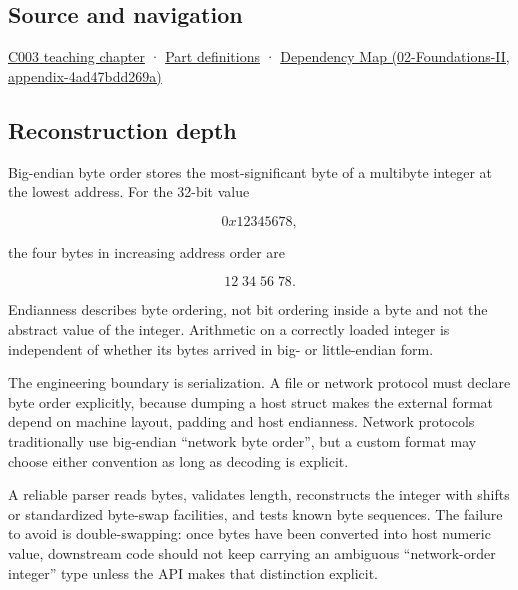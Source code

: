 \subsection{Source and navigation}\label{appendix-92e040df969a-source-and-navigation}

\hyperref[01-foundations-i-ch002-where-the-bytes-live]{C003 teaching chapter} · \hyperref[appendix-fd090d982a15-m003---parts-41-60]{Part definitions} · \href{../02-Foundations-II/main.pdf\#nameddest=appendix-4ad47bdd269a}{Dependency Map (02-Foundations-II, appendix-4ad47bdd269a)}

\subsection{Reconstruction depth}\label{appendix-92e040df969a-reconstruction-depth}

Big-endian byte order stores the most-significant byte of a multibyte integer at the lowest address. For the 32-bit value

\[
0x12345678,
\]

the four bytes in increasing address order are

\[
12\;34\;56\;78.
\]

Endianness describes byte ordering, not bit ordering inside a byte and not the abstract value of the integer. Arithmetic on a correctly loaded integer is independent of whether its bytes arrived in big- or little-endian form.

The engineering boundary is serialization. A file or network protocol must declare byte order explicitly, because dumping a host struct makes the external format depend on machine layout, padding and host endianness. Network protocols traditionally use big-endian ``network byte order'', but a custom format may choose either convention as long as decoding is explicit.

A reliable parser reads bytes, validates length, reconstructs the integer with shifts or standardized byte-swap facilities, and tests known byte sequences. The failure to avoid is double-swapping: once bytes have been converted into host numeric value, downstream code should not keep carrying an ambiguous ``network-order integer'' type unless the API makes that distinction explicit.
